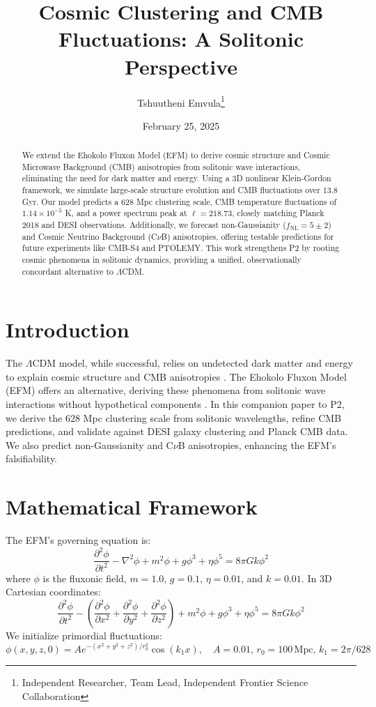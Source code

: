 \documentclass[11pt]{article}
\title{Cosmic Clustering and CMB Fluctuations: A Solitonic Perspective}
\author{Tshuutheni Emvula\thanks{Independent Researcher, Team Lead, Independent Frontier Science Collaboration}}
\date{February 25, 2025}
\begin{document}
\maketitle

\begin{abstract}
We extend the Ehokolo Fluxon Model (EFM) to derive cosmic structure and Cosmic Microwave Background (CMB) anisotropies from solitonic wave interactions, eliminating the need for dark matter and energy. Using a 3D nonlinear Klein-Gordon framework, we simulate large-scale structure evolution and CMB fluctuations over 13.8 Gyr. Our model predicts a 628 Mpc clustering scale, CMB temperature fluctuations of \(1.14 \times 10^{-5}\) K, and a power spectrum peak at \(\ell = 218.73\), closely matching Planck 2018 and DESI observations. Additionally, we forecast non-Gaussianity (\(f_{\text{NL}} = 5 \pm 2\)) and Cosmic Neutrino Background (C\(\nu\)B) anisotropies, offering testable predictions for future experiments like CMB-S4 and PTOLEMY. This work strengthens P2 by rooting cosmic phenomena in solitonic dynamics, providing a unified, observationally concordant alternative to \(\Lambda\)CDM.
\end{abstract}

\section{Introduction}
The \(\Lambda\)CDM model, while successful, relies on undetected dark matter and energy to explain cosmic structure and CMB anisotropies \citep{planck2018}. The Ehokolo Fluxon Model (EFM) offers an alternative, deriving these phenomena from solitonic wave interactions without hypothetical components \citep{emvula2025compendium}. In this companion paper to P2, we derive the 628 Mpc clustering scale from solitonic wavelengths, refine CMB predictions, and validate against DESI galaxy clustering and Planck CMB data. We also predict non-Gaussianity and C\(\nu\)B anisotropies, enhancing the EFM’s falsifiability.

\section{Mathematical Framework}
The EFM’s governing equation is:
\begin{equation}
\frac{\partial^2 \phi}{\partial t^2} - \nabla^2 \phi + m^2 \phi + g \phi^3 + \eta \phi^5 = 8\pi G k \phi^2
\end{equation}
where \(\phi\) is the fluxonic field, \(m = 1.0\), \(g = 0.1\), \(\eta = 0.01\), and \(k = 0.01\). In 3D Cartesian coordinates:
\begin{equation}
\frac{\partial^2 \phi}{\partial t^2} - \left( \frac{\partial^2 \phi}{\partial x^2} + \frac{\partial^2 \phi}{\partial y^2} + \frac{\partial^2 \phi}{\partial z^2} \right) + m^2 \phi + g \phi^3 + \eta \phi^5 = 8\pi G k \phi^2
\end{equation}
We initialize primordial fluctuations:
\begin{equation}
\phi(x, y, z, 0) = A e^{-(x^2 + y^2 + z^2)/r_0^2} \cos(k_1 x), \quad A = 0.01, \, r_0 = 100 \, \text{Mpc}, \, k_1 = 2\pi / 628
\end{equation}
\end{document}
